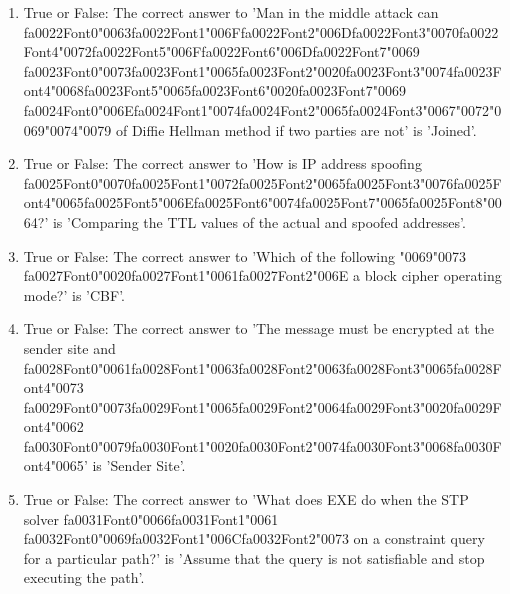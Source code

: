 \documentclass[12pt]{article}
\begin{document}
\begin{enumerate}[label=\arabic*.]
\item True or False: The correct answer to 'Man in the middle attack can {\csname fa0022Font0\endcsname\char"0063}{\csname fa0022Font1\endcsname\char"006F}{\csname fa0022Font2\endcsname\char"006D}{\csname fa0022Font3\endcsname\char"0070}{\csname fa0022Font4\endcsname\char"0072}{\csname fa0022Font5\endcsname\char"006F}{\csname fa0022Font6\endcsname\char"006D}{\csname fa0022Font7\endcsname\char"0069} {\csname fa0023Font0\endcsname\char"0073}{\csname fa0023Font1\endcsname\char"0065}{\csname fa0023Font2\endcsname\char"0020}{\csname fa0023Font3\endcsname\char"0074}{\csname fa0023Font4\endcsname\char"0068}{\csname fa0023Font5\endcsname\char"0065}{\csname fa0023Font6\endcsname\char"0020}{\csname fa0023Font7\endcsname\char"0069} {\csname fa0024Font0\endcsname\char"006E}{\csname fa0024Font1\endcsname\char"0074}{\csname fa0024Font2\endcsname\char"0065}{\csname fa0024Font3\endcsname\char"0067}{\char"0072}{\char"0069}{\char"0074}{\char"0079} of Diffie Hellman method if two parties are not' is 'Joined'.
\item True or False: The correct answer to 'How is IP address spoofing {\csname fa0025Font0\endcsname\char"0070}{\csname fa0025Font1\endcsname\char"0072}{\csname fa0025Font2\endcsname\char"0065}{\csname fa0025Font3\endcsname\char"0076}{\csname fa0025Font4\endcsname\char"0065}{\csname fa0025Font5\endcsname\char"006E}{\csname fa0025Font6\endcsname\char"0074}{\csname fa0025Font7\endcsname\char"0065}{\csname fa0025Font8\endcsname\char"0064}?' is 'Comparing the TTL values of the actual and spoofed addresses'.
\item True or False: The correct answer to 'Which of the following {\char"0069}{\char"0073} {\csname fa0027Font0\endcsname\char"0020}{\csname fa0027Font1\endcsname\char"0061}{\csname fa0027Font2\endcsname\char"006E} a block cipher operating mode?' is 'CBF'.
\item True or False: The correct answer to 'The message must be encrypted at the sender site and {\csname fa0028Font0\endcsname\char"0061}{\csname fa0028Font1\endcsname\char"0063}{\csname fa0028Font2\endcsname\char"0063}{\csname fa0028Font3\endcsname\char"0065}{\csname fa0028Font4\endcsname\char"0073} {\csname fa0029Font0\endcsname\char"0073}{\csname fa0029Font1\endcsname\char"0065}{\csname fa0029Font2\endcsname\char"0064}{\csname fa0029Font3\endcsname\char"0020}{\csname fa0029Font4\endcsname\char"0062} {\csname fa0030Font0\endcsname\char"0079}{\csname fa0030Font1\endcsname\char"0020}{\csname fa0030Font2\endcsname\char"0074}{\csname fa0030Font3\endcsname\char"0068}{\csname fa0030Font4\endcsname\char"0065}' is 'Sender Site'.
\item True or False: The correct answer to 'What does EXE do when the STP solver {\csname fa0031Font0\endcsname\char"0066}{\csname fa0031Font1\endcsname\char"0061} {\csname fa0032Font0\endcsname\char"0069}{\csname fa0032Font1\endcsname\char"006C}{\csname fa0032Font2\endcsname\char"0073} on a constraint query for a particular path?' is 'Assume that the query is not satisfiable and stop executing the path'.
\end{enumerate}
\end{document}
